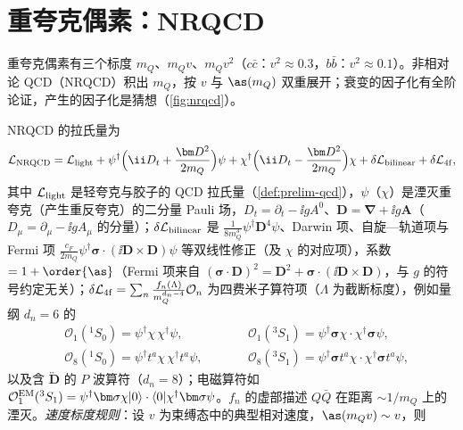 \section{重夸克偶素：NRQCD}\label{sec:heavy-nrqcd}

重夸克偶素有三个标度 $m_Q$、$m_Qv$、$m_Qv^2$（$c\bar c$：$v^2\approx0.3$，$b\bar b$：$v^2\approx0.1$\cite[第~II.A~节]{BodwinBraatenLepage1995}）。非相对论 QCD（NRQCD）积出 $m_Q$，按 $v$ 与 $\as(m_Q)$ 双重展开\cite{CaswellLepage1986,BodwinBraatenLepage1995}；衰变的因子化有全阶论证，产生的因子化是猜想（\cref{fig:nrqcd}）。

\begin{definition}\label{def:heavy-nrqcd}
NRQCD 的拉氏量为
\begin{equation}\label{eq:heavy-LNRQCD}
\mathcal L_{\rm NRQCD}=\mathcal L_{\rm light}+\psi^\dagger\Big(\ii D_t+\frac{\bm D^2}{2m_Q}\Big)\psi+\chi^\dagger\Big(\ii D_t-\frac{\bm D^2}{2m_Q}\Big)\chi+\delta\mathcal L_{\rm bilinear}+\delta\mathcal L_{\rm 4f},
\end{equation}
其中 $\mathcal L_{\rm light}$ 是轻夸克与胶子的 QCD 拉氏量（\cref{def:prelim-qcd}），$\psi$（$\chi$）是湮灭重夸克（产生重反夸克）的二分量 Pauli 场，$D_t=\partial_t-\ii gA^0$、$\bm D=\bm\nabla+\ii g\bm A$（$D_\mu=\partial_\mu-\ii gA_\mu$ 的分量）；$\delta\mathcal L_{\rm bilinear}$ 是 $\frac{1}{8m_Q^3}\psi^\dagger\bm D^4\psi$、Darwin 项、自旋—轨道项与 Fermi 项 $\frac{c_F}{2m_Q}\psi^\dagger\bm\sigma\cdot(\ii\bm D\times\bm D)\psi$ 等双线性修正（及 $\chi$ 的对应项），系数 $=1+\order{\as}$（Fermi 项来自 $(\bm\sigma\cdot\bm D)^2=\bm D^2+\bm\sigma\cdot(\ii\bm D\times\bm D)$，与 $g$ 的符号约定无关）；$\delta\mathcal L_{\rm 4f}=\sum_n\frac{f_n(\Lambda)}{m_Q^{d_n-4}}\mathcal O_n$ 为四费米子算符项（$\Lambda$ 为截断标度），例如量纲 $d_n=6$ 的
\begin{equation}\label{eq:heavy-4f}
\begin{aligned}
&\mathcal O_1({}^1S_0)=\psi^\dagger\chi\,\chi^\dagger\psi,&\qquad&\mathcal O_1({}^3S_1)=\psi^\dagger\bm\sigma\chi\cdot\chi^\dagger\bm\sigma\psi,\\
&\mathcal O_8({}^1S_0)=\psi^\dagger t^a\chi\,\chi^\dagger t^a\psi,&\qquad&\mathcal O_8({}^3S_1)=\psi^\dagger\bm\sigma t^a\chi\cdot\chi^\dagger\bm\sigma t^a\psi,
\end{aligned}
\end{equation}
以及含 $\overleftrightarrow{\bm D}$ 的 $P$ 波算符（$d_n=8$）；电磁算符如 $\mathcal O^{\rm EM}_1({}^3S_1)=\psi^\dagger\bm\sigma\chi|0\rangle\cdot\langle0|\chi^\dagger\bm\sigma\psi$。$f_n$ 的虚部描述 $Q\bar Q$ 在距离 $\sim1/m_Q$ 上的湮灭。\emph{速度标度规则}：设 $v$ 为束缚态中的典型相对速度，$\as(m_Qv)\sim v$，则

\end{definition}
